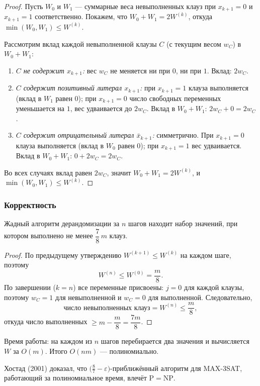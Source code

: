 \begin{proof}
	Пусть $W_0$ и $W_1$ --- суммарные веса невыполненных клауз при $x_{k+1} = 0$ и $x_{k+1} = 1$ соответственно. Покажем, что $W_0 + W_1 = 2W^{(k)}$, откуда $\min(W_0, W_1) \leq W^{(k)}$.
	
	Рассмотрим вклад каждой невыполненной клаузы $C$ (с текущим весом $w_C$) в $W_0 + W_1$:
	\begin{enumerate}
		\item \emph{$C$ не содержит $x_{k+1}$:} вес $w_C$ не меняется ни при $0$, ни при $1$. Вклад: $2w_C$.
		
		\item \emph{$C$ содержит позитивный литерал $x_{k+1}$:}
		при $x_{k+1} = 1$ клауза выполняется (вклад в $W_1$ равен $0$);
		при $x_{k+1} = 0$ число свободных переменных уменьшается на $1$, вес удваивается до $2w_C$.
		Вклад в $W_0 + W_1$: $2w_C + 0 = 2w_C$.
		
		\item \emph{$C$ содержит отрицательный литерал $\bar{x}_{k+1}$:} симметрично.
		При $x_{k+1} = 0$ клауза выполняется (вклад в $W_0$ равен $0$);
		при $x_{k+1} = 1$ вес удваивается.
		Вклад в $W_0 + W_1$: $0 + 2w_C = 2w_C$.
	\end{enumerate}
	
	Во всех случаях вклад равен $2w_C$, значит $W_0 + W_1 = 2W^{(k)}$, и $\min(W_0, W_1) \leq W^{(k)}$.
\end{proof}

\subsubsection*{Корректность}

\begin{Theorem}{}{}
	Жадный алгоритм дерандомизации за $n$ шагов находит набор значений, при котором выполнено не менее $\dfrac{7}{8}\,m$ клауз.
\end{Theorem}

\begin{proof}
	По предыдущему утверждению $W^{(k+1)} \leq W^{(k)}$ на каждом шаге, поэтому
	\[
	W^{(n)} \leq W^{(0)} = \frac{m}{8}.
	\]
	По завершении ($k = n$) все переменные присвоены: $j = 0$ для каждой клаузы, поэтому $w_C = 1$ для невыполненной и $w_C = 0$ для выполненной. Следовательно,
	\[
	\text{число невыполненных клауз} = W^{(n)} \leq \frac{m}{8},
	\]
	откуда число выполненных $\geq m - \dfrac{m}{8} = \dfrac{7m}{8}$.
\end{proof}

\begin{Remark}{}{}
	Время работы: на каждом из $n$ шагов перебирается два значения и вычисляется $W$ за $O(m)$. Итого $O(nm)$ --- полиномиально.
\end{Remark}

\begin{Remark}{}{}
	Хостад (2001) доказал, что $\bigl(\tfrac{8}{7} - \varepsilon\bigr)$-приближённый алгоритм для MAX-3SAT, работающий за полиномиальное время, влечёт $\mathrm{P} = \mathrm{NP}$.
\end{Remark}